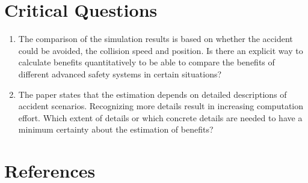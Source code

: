 \documentclass[oneside, notitlepage, twocolumn]{scrartcl}
\begin{document}
\section{Critical Questions}
\begin{enumerate}
    \item The comparison of the simulation results is based on whether the accident could be avoided, the collision speed and position.
        Is there an explicit way to calculate benefits quantitatively to be able to compare the benefits of different advanced safety systems in certain situations?
    \item The paper states that the estimation depends on detailed descriptions of accident scenarios.
        Recognizing more details result in increasing computation effort.
        Which extent of details or which concrete details are needed to have a minimum certainty about the estimation of benefits?
\end{enumerate}

\section{References}
\begingroup
\renewcommand{\section}[2]{}%
\nocite{*}
\printbibliography%
\endgroup
\end{document}
